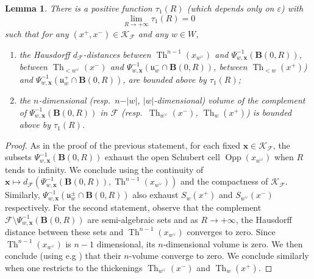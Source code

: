 \documentclass[12pt]{amsbook}%
\newtheorem{lem}[thm]{Lemma}
\theoremstyle{definition}
\theoremstyle{remark}
\numberwithin{section}{chapter}
\numberwithin{subsection}{section}
\numberwithin{figure}{chapter}
\DeclareMathOperator{\Th}{Th}
\DeclareMathOperator{\Opp}{Opp}
\newcommand\bac[1]{{\color{blue} #1} }
\def\cF{{\mathscr{F}}}
\def\Swx{{S_w(x^+)}}
\def\Swxd{{S_{w^\vee}(x^-)}}
\def\xpair{{(x^+,x^-)}}
\def\bx{\mathbf{x}}
\def\kap{}
\begin{document}
{{\begin{lem}\label{comparison_metric_balls}
There is a positive function $\tau_1(R)$ (which depends only on $\varepsilon$) with 
$$\lim_{R\rightarrow +\infty}\tau_1(R)=0$$
such that for any $\xpair\in \mathscr{K}_\cF$ and any $w\in W$, 
\begin{enumerate} 
\item the Hausdorff $d_{\cF}$-distances between $\Th^{n-1}(x_{w^\vee})$ 
and $\Psi_{w,\bx}^{-1}( \mathbf{B}(0,R))$, between $\Th_{<w^\vee}(x^-)$ and 
$\Psi_{w,\bx}^{-1}(\mathfrak{u}^-_w \cap \mathbf{B}(0,R))$, between 
$\Th_{<w}(x^+)$)  %
and $\Psi_{w,\bx}^{-1}(\mathfrak{u}^+_w \cap \mathbf{B}(0,R))$, %
are bounded above by $\tau_1(R)$; 
\item the $n$-dimensional (resp.\ $n-\vert w\vert$, $\vert w \vert$-dimensional) volume of the complement of $\Psi_{w,\bx}^{-1}(\mathbf{B}(0,R))$ in $\cF$ (resp.\ $\Th_{w^\vee}(x^-)$, $\Th_w(x^+)$) is bounded above by $\tau_1(R)$. 
\end{enumerate}
\end{lem}
\begin{proof}
As in the proof of the previous statement, for each fixed $\bx\in \mathcal{K}_{\cF}$, the subsets $\Psi_{w,\bx}^{-1}(\mathbf{B}(0,R))$ exhaust the open Schubert cell $\Opp(x_{w^\vee})$ when $R$ tends to infinity. We conclude using the continuity of $\bx \mapsto d_{\cF}(\Psi_{w,\bx}^{-1}(\mathbf{B}(0,R)), \Th^{n-1}(x_{w^\vee}))$ and the compactness of $\mathcal{K}_{\cF}$.    
Similarly, $\Psi_{w,\bx}^{-1}(\mathfrak{u}^\pm_w \cap \mathbf{B}(0,R))$ also exhaust $S_w(x^+)$ and  $S_{w^\vee}(x^-)$ respectively. 
For the second statement, observe that the complement  $\cF \setminus \Psi_{w,\bx}^{-1}(\mathbf{B}(0,R))$ are semi-algebraic sets and as $R \rightarrow +\infty$,  the Hausdorff distance between these sets and $\Th^{n-1}(x_{w^\vee})$ converges to zero. Since $\Th^{n-1}(x_{w^\vee})$ is $n-1$ dimensional, its $n$-dimensional volume is zero. We then conclude (using e.g \cite[Theorem 5.10]{yomdin_comte}) that their $n$-volume converge to zero. We conclude similarly when one restricts to the thickenings $\Th_{w^\vee}(x^-)$ and $\Th_w(x^+)$. 
\end{proof}





}}
\end{document}

